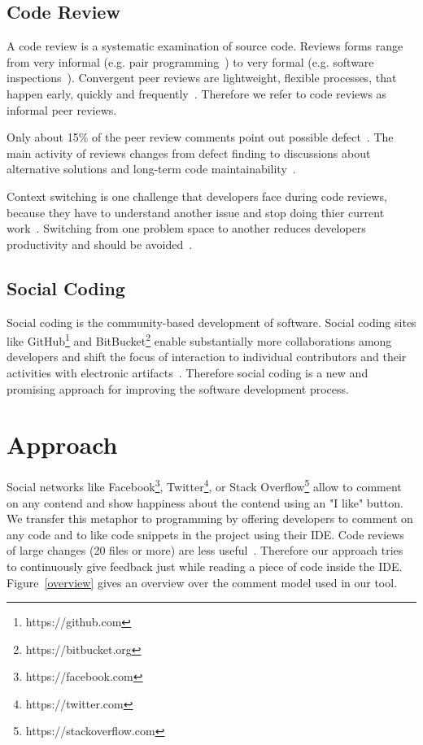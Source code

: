 \documentclass[10pt, conference]{IEEEtran}
\begin{document}
\subsection{Code Review}
A code review is a systematic examination of source code. 
%
Reviews forms range from very informal (e.g. pair programming~\cite{beck2000extreme}) to very formal (e.g. software inspections~\cite{fagan2001design, ackerman1989software}). 
%
Convergent peer reviews are lightweight, flexible processes, that happen early, quickly and frequently~\cite{rigby2013PeerCodeReviews, shimagaki2016CRInSony}. 
%
Therefore we refer to code reviews as informal peer reviews. 
%
 
%
Only about 15\% of the peer review comments point out possible defect~\cite{czerwonka2015codereviews}. 
%
The main activity of reviews changes from defect finding to discussions about alternative solutions and long-term code maintainability~\cite{rigby2013PeerCodeReviews, czerwonka2015codereviews}.
%

%
Context switching is one challenge that developers face during code reviews, because they have to understand another issue and stop doing thier current work~\cite{czerwonka2015codereviews, kononenko2016codereviewquality}.
%
Switching from one problem space to another reduces developers productivity and should be avoided~\cite{poppendieck2003lean}.
\subsection{Social Coding}
Social coding is the community-based development of software.
%
Social coding sites like GitHub\footnote{https://github.com} and BitBucket\footnote{https://bitbucket.org} enable substantially more collaborations among developers \cite{thung2013github} and shift the focus of interaction to individual contributors and their activities with electronic artifacts~\cite{dabbish2012social}.
%
Therefore social coding is a new and promising approach for improving the software development process. 
\section{Approach}
Social networks like Facebook\footnote{https://facebook.com}, Twitter\footnote{https://twitter.com}, or Stack Overflow\footnote{https://stackoverflow.com} allow to comment on any contend and show happiness about the contend using an "I like" button.
% 
We transfer this metaphor to programming by offering developers to comment on any code and to like code snippets in the project using their IDE.  
%
Code reviews of large changes (20 files or more) are less useful~\cite{czerwonka2015codereviews}.
%
Therefore our approach tries to continuously give feedback just while reading a piece of code inside the IDE. 
%
Figure~\ref{overview} gives an overview over the comment model used in our tool.
\end{document}
